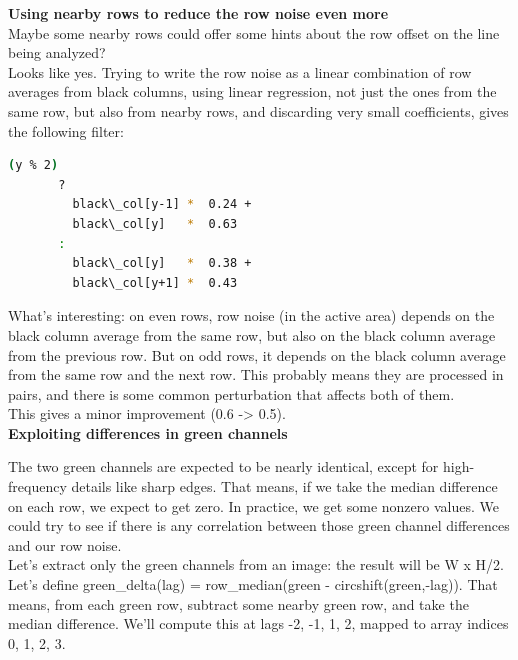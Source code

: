 {\textbf{Using nearby rows to reduce the row noise even more}\\

Maybe some nearby rows could offer some hints about the row offset on the line being analyzed?\\

Looks like yes. Trying to write the row noise as a linear combination of row averages from black columns, using linear regression, not just the ones from the same row, but also from nearby rows, and discarding very small coefficients, gives the following filter:\\

 \begin{lstlisting}[language=bash,morekeywords=$,keywordstyle=\bfseries,frame=none,xleftmargin=.25in,belowskip=2em, aboveskip=2em]
    (y % 2)
       ?
         black\_col[y-1] *  0.24 +
         black\_col[y]   *  0.63
       :
         black\_col[y]   *  0.38 +
         black\_col[y+1] *  0.43
\end{lstlisting}

What's interesting: on even rows, row noise (in the active area) depends on the black column average from the same row, but also on the black column average from the previous row. But on odd rows, it depends on the black column average from the same row and the next row. This probably means they are processed in pairs, and there is some common perturbation that affects both of them.\\

This gives a minor improvement (0.6 -> 0.5). \\

\textbf{Exploiting differences in green channels}

The two green channels are expected to be nearly identical, except for high-frequency details like sharp edges. That means, if we take the median difference on each row, we expect to get zero. In practice, we get some nonzero values. We could try to see if there is any correlation between those green channel differences and our row noise.\\

Let's extract only the green channels from an image: the result will be W x H/2. Let's define green_delta(lag) = row_median(green - circshift(green,-lag)). That means, from each green row, subtract some nearby green row, and take the median difference. We'll compute this at lags -2, -1, 1, 2, mapped to array indices 0, 1, 2, 3.\\

}
